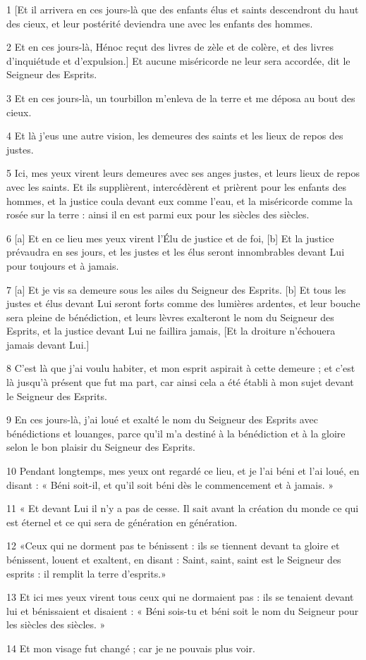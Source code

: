 \par 1 [Et il arrivera en ces jours-là que des enfants élus et saints descendront du haut des cieux, et leur postérité deviendra une avec les enfants des hommes.
\par 2 Et en ces jours-là, Hénoc reçut des livres de zèle et de colère, et des livres d'inquiétude et d'expulsion.] Et aucune miséricorde ne leur sera accordée, dit le Seigneur des Esprits.
\par 3 Et en ces jours-là, un tourbillon m'enleva de la terre et me déposa au bout des cieux.
\par 4 Et là j'eus une autre vision, les demeures des saints et les lieux de repos des justes.
\par 5 Ici, mes yeux virent leurs demeures avec ses anges justes, et leurs lieux de repos avec les saints. Et ils supplièrent, intercédèrent et prièrent pour les enfants des hommes, et la justice coula devant eux comme l'eau, et la miséricorde comme la rosée sur la terre : ainsi il en est parmi eux pour les siècles des siècles.
\par 6 [a] Et en ce lieu mes yeux virent l'Élu de justice et de foi, [b] Et la justice prévaudra en ses jours, et les justes et les élus seront innombrables devant Lui pour toujours et à jamais.
\par 7 [a] Et je vis sa demeure sous les ailes du Seigneur des Esprits. [b] Et tous les justes et élus devant Lui seront forts comme des lumières ardentes, et leur bouche sera pleine de bénédiction, et leurs lèvres exalteront le nom du Seigneur des Esprits, et la justice devant Lui ne faillira jamais, [Et la droiture n’échouera jamais devant Lui.]
\par 8 C'est là que j'ai voulu habiter, et mon esprit aspirait à cette demeure ; et c'est là jusqu'à présent que fut ma part, car ainsi cela a été établi à mon sujet devant le Seigneur des Esprits.
\par 9 En ces jours-là, j'ai loué et exalté le nom du Seigneur des Esprits avec bénédictions et louanges, parce qu'il m'a destiné à la bénédiction et à la gloire selon le bon plaisir du Seigneur des Esprits.
\par 10 Pendant longtemps, mes yeux ont regardé ce lieu, et je l'ai béni et l'ai loué, en disant : « Béni soit-il, et qu'il soit béni dès le commencement et à jamais. »
\par 11 « Et devant Lui il n’y a pas de cesse. Il sait avant la création du monde ce qui est éternel et ce qui sera de génération en génération.
\par 12 «Ceux qui ne dorment pas te bénissent : ils se tiennent devant ta gloire et bénissent, louent et exaltent, en disant : Saint, saint, saint est le Seigneur des esprits : il remplit la terre d'esprits.»
\par 13 Et ici mes yeux virent tous ceux qui ne dormaient pas : ils se tenaient devant lui et bénissaient et disaient : « Béni sois-tu et béni soit le nom du Seigneur pour les siècles des siècles. »
\par 14 Et mon visage fut changé ; car je ne pouvais plus voir.


